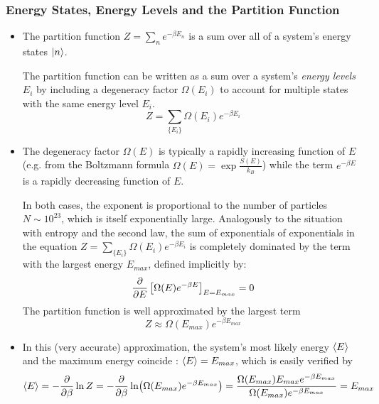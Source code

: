 \documentclass[11pt, a4paper]{article}
\begin{document}
\subsubsection{Energy States, Energy Levels and the Partition Function}
\begin{itemize}
	\item The partition function $ Z = \sum_{n}e^{-\beta E_{n}} $ is a sum over all of a system's energy states $ \ket{n} $. 
	
	The partition function can be written as a sum over a system's \textit{energy levels} $ E_{i} $ by including a degeneracy factor $ \Omega(E_{i}) $ to account for multiple states with the same energy level $ E_{i} $. 
	\begin{equation*}
		Z = \sum_{\{E_{i}\}} \Omega(E_{i})e^{-\beta E_{i}}
	\end{equation*}
	
	\item The degeneracy factor $ \Omega(E) $ is typically a rapidly increasing function of $ E $ (e.g. from the Boltzmann formula $ \Omega(E) = \exp \frac{S(E)}{k_{B}} $) while the term $ e^{-\beta E} $ is a rapidly decreasing function of $ E $. 
	
	In both cases, the exponent is proportional to the number of particles $ N \sim 10^{23} $, which is itself exponentially large. Analogously to the situation with entropy and the second law, the sum of exponentials of exponentials in the equation $ Z = \sum_{\{E_{i}\}} \Omega(E_{i})e^{-\beta E_{i}} $ is completely dominated by the term with the largest energy $ E_{max} $, defined implicitly by:
	\begin{equation*}
		\pdv{}{E}\left[\Omega(E)e^{-\beta E}\right]_{E = E_{max}} = 0
	\end{equation*}
	The partition function is well approximated by the largest term
	\begin{equation*}
		Z \approx \Omega(E_{max})e^{-\beta E_{max}}
	\end{equation*}
	
	\item In this (very accurate) approximation, the system's most likely energy $ \expval{E} $ and the maximum energy coincide : $ \expval{E} = E_{max} $, which is easily verified by
	\begin{equation*}
		\expval{E} = -\pdv{}{\beta}\ln Z = - \pdv{}{\beta}\ln( \Omega(E_{max})e^{-\beta E_{max}}) = \frac{\Omega(E_{max})E_{max}e^{-\beta E_{max}}}{\Omega(E_{max})e^{-\beta E_{max}}} = E_{max}
	\end{equation*}
	

\end{itemize}
\end{document}
